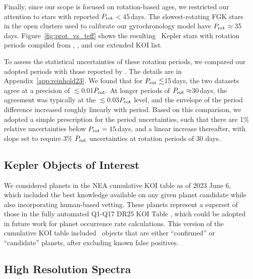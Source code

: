 \documentclass[11pt,twocolumn,tighten]{aastex63}
\begin{document}
Finally, since our scope is focused on rotation-based ages, we
restricted our attention to stars with reported $P_{\rm
rot}$$<$45\,days.  The slowest-rotating FGK
stars in the open clusters used to
calibrate our gyrochronology model have $P_{\rm rot}$$\approx$35\,days.
Figure~\ref{fig:prot_vs_teff}
shows the resulting \nuniqstarsantosrot\ Kepler stars with rotation
periods compiled from ,
, and our extended KOI list.

To assess the statistical uncertainties of these rotation periods, we
compared our adopted periods with those reported by
\citet{McQuillan_2014}.  The details are in Appendix~\ref{app:reinhold23}.  We found
that for $P_{\rm rot}\lesssim$15\,days, the two datasets agree at a
precision of $\lesssim$0.01$P_{\rm rot}$.  At longer periods of
$P_{\rm rot}\approx$30\,days, the agreement was typically at the
$\lesssim$0.03$P_{\rm rot}$ level, and the envelope of the
period difference increased roughly linearly with period.  Based on
this comparison, we adopted a simple prescription for the period
uncertainties, such that there are 1\% relative uncertainties below
$P_{\rm rot}=15$\,days, and a linear increase thereafter, with slope
set to require 3\% $P_{\rm rot}$ uncertainties at rotation periods of
30 days.







\subsection{Kepler Objects of Interest}
\label{subsec:planetsel}

We considered planets in the NEA cumulative KOI table as of 2023 June
6, which included the best knowledge available on any given planet
candidate while also incorporating human-based vetting.  These planets
represent a superset of those in the fully automated Q1-Q17 DR25 KOI
Table \citep{Thompson_2018}, which could be adopted in future work for
planet occurrence rate calculations.  This version of the cumulative
KOI table included \nkoisnofp\ objects that are either ``confirmed''
or ``candidate'' planets, after excluding known false positives. 

\subsection{High Resolution Spectra}
\label{subsec:lithiumsel}
\end{document}
